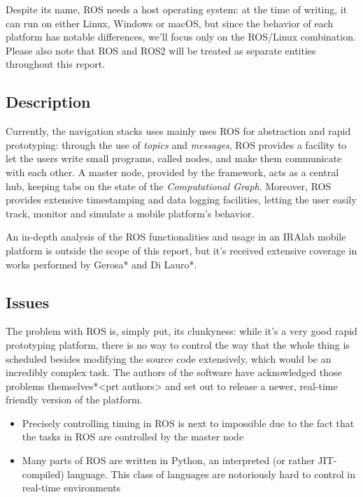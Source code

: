 \documentclass[a4paper,12pt]{report}
\begin{document}
Despite its name, ROS needs a host operating system: at the time of writing, it can run on either Linux, Windows or macOS, but since the behavior of each platform has notable differences, we'll focus only on the ROS/Linux combination. Please also note that ROS and ROS2 will be treated as separate entities throughout this report.

\subsection{Description}

Currently, the navigation stacks uses mainly uses ROS for abstraction and rapid prototyping: through the use of \textit{topics} and \textit{messages}, ROS provides a facility to let the users write small programs, called nodes, and make them communicate with each other. A master node, provided by the framework, acts as a central hub, keeping tabs on the state of the \textit{Computational Graph}. Moreover, ROS provides extensive timestamping and data logging facilities, letting the user easily track, monitor and simulate a mobile platform's behavior.

An in-depth analysis of the ROS functionalities and usage in an IRAlab mobile platform is outside the scope of this report, but it's received extensive coverage in works performed by Gerosa* and Di Lauro*.

\subsection{Issues}

The problem with ROS is, simply put, its clunkyness: while it's a very good rapid prototyping platform, there is no way to control the way that the whole thing is scheduled besides modifying the source code extensively, which would be an incredibly complex task. The authors of the software have acknowledged those problems themselves*<prt authors> and set out to release a newer, real-time friendly version of the platform.

\begin{itemize}
    \item Precisely controlling timing in ROS is next to impossible due to the fact that the tasks in ROS are controlled by the master node
    \item Many parts of ROS are written in Python, an interpreted (or rather JIT-compiled) language. This class of languages are notoriously hard to control in real-time environments
\end{itemize}
\end{document}
